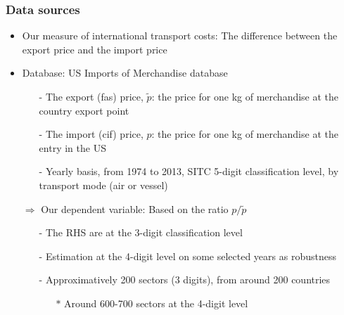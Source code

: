 \documentclass[10 pt,Helvetica, french]{beamer}
\begin{document}
\begin{frame} [label=slide_data]
\frametitle{Data sources}
\begin{itemize}
\item Our measure of international transport costs: The difference between the export price and the import price \vspace{0.1cm}
\item Database: US Imports of Merchandise database \vspace{0.1cm}
\begin{itemize}
\item[-] The export (fas) price, $\widetilde{p}$: the price for one kg of merchandise at the country export point \vspace{0.1cm}
\item[-] The import (cif) price, $p$: the price for one kg of merchandise at the entry in the US \vspace{0.1cm}
\item[-] Yearly basis, from 1974 to 2013, SITC 5-digit classification level, by transport mode (air or vessel) \vspace{0.1cm}
\end{itemize}
\item[$\Rightarrow$] Our dependent variable: Based on the ratio $p/\widetilde{p}$ \vspace{0.1cm}
\begin{itemize}
\item[-] The RHS are at the 3-digit classification level  \vspace{0.1cm}
\item[-] Estimation at the 4-digit level on some selected years as robustness \vspace{0.1cm}
\item[-] Approximatively 200 sectors (3 digits), from around 200 countries  \vspace{0.1cm}
\begin{itemize}
\item[$\ast$] Around 600-700 sectors at the 4-digit level
\end{itemize}
\end{itemize}
\end{itemize}
\end{frame}
\end{document}
